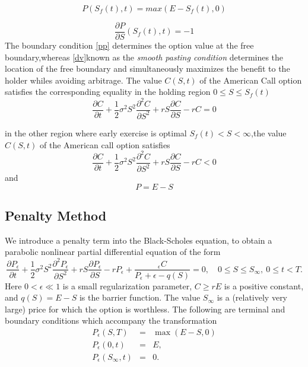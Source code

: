 \documentclass[12pt]{article}
\numberwithin{equation}{section} %
\newtheorem{theorem}[fact]{Theorem}
\begin{document}
 \begin{equation}\label{pp}
P(S_{f}(t),t)=max(E-S_{f}(t),0)
 \end{equation}

\begin{equation}\label{dv}
 \frac{\partial P}{\partial S}(S_{f}(t),t)=-1
 \end{equation}
  The boundary condition \ref{pp} determines the option value at the
  free boundary,whereas \ref{dv}known as the \textit{smooth pasting condition} determines the location of the
  free boundary and simultaneously maximizes the benefit to the
  holder whiles avoiding arbitrage.
  The value $C(S,t)$ of the American Call  option satisfies the
  corresponding equality in the holding region
 $0\leq S\leq S_{f}(t)$
 \begin{equation}
\frac{\partial C}{\partial t}+\frac{1}{2}\sigma^2S^2\frac{\partial^2
C}{\partial S^2} +rS\frac{\partial C}{\partial S}-rC=0
 \end{equation}

in the other region where early exercise is optimal $S_{f}(t)<
S<\infty$,the value $C(S,t)$ of the American call option satisfies
 \begin{equation}
\frac{\partial C}{\partial t}+\frac{1}{2}\sigma^2S^2\frac{\partial^2
C}{\partial S^2} +rS\frac{\partial C}{\partial S}-rC<0
 \end{equation}
 and
 \begin{equation}
P=E-S
 \end{equation}
\subsection{Penalty Method}
We  introduce a penalty term into the Black-Scholes equation, to
obtain a parabolic nonlinear partial differential equation of the
form\cite{BOA08}
\begin{equation}\label{BSpenalty}
\frac{\partial P_\epsilon}{\partial
t}+\frac{1}{2}\sigma^2S^2\frac{\partial^2 P_\epsilon}{\partial S^2}
+rS\frac{\partial P_\epsilon}{\partial
S}-rP_\epsilon+\frac{_\epsilon C }{P_\epsilon + \epsilon - q(S)}=0,
\quad 0 \leq S \leq S_\infty, \ 0 \leq t < T.
\end{equation}
Here $0 < \epsilon \ll1$ is a small regularization parameter, $C
\geq rE$ is a positive constant, and $q(S) = E - S$ is the barrier
function. The value $S_\infty$ is a (relatively very large) price
for which the option is worthless. The  following are  terminal and
boundary conditions which  accompany the transformation
\begin{eqnarray}
P_\epsilon(S,T) & = & \max (E-S,0)\\
P_\epsilon(0,t) & = & E,\\
P_\epsilon(S_\infty,t) & = & 0.
\end{eqnarray}
\end{document}
